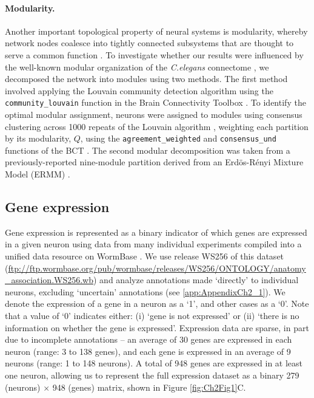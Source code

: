 \paragraph{Modularity.}
Another important topological property of neural systems is modularity, whereby network nodes coalesce into tightly connected subsystems that are thought to serve a common function \citep{Sporns2016}.
To investigate whether our results were influenced by the well-known modular organization of the \emph{C.elegans} connectome \citep{Kim2014a, Pan2010, Bassett2010, Achacoso1992, Pavlovic2014}, we decomposed the network into modules using two methods.
The first method involved applying the Louvain community detection algorithm \citep{Blondel2008} using the \texttt{community\_louvain} function in the Brain Connectivity Toolbox \citep{Rubinov2010}.
To identify the optimal modular assignment, neurons were assigned to modules using consensus clustering across 1000 repeats of the Louvain algorithm \citep{Lancichinetti2012}, weighting each partition by its modularity, $Q$, using the \texttt{agreement\_weighted} and \texttt{consensus\_und} functions of the BCT \citep{Rubinov2010}.
The second modular decomposition was taken from a previously-reported nine-module partition derived from an Erd\"os-R\'enyi Mixture Model (ERMM) \citep{Pavlovic2014}.

\subsection*{Gene expression}
Gene expression is represented as a binary indicator of which genes are expressed in a given neuron using data from many individual experiments compiled into a unified data resource on WormBase \citep{Harris2010}.
We use release WS256 of this dataset (\url{ftp://ftp.wormbase.org/pub/wormbase/releases/WS256/ONTOLOGY/anatomy_association.WS256.wb}) and analyze annotations made `directly' to individual neurons, excluding `uncertain' annotations (see \ref{app:AppendixCh2_1}).
We denote the expression of a gene in a neuron as a `1', and other cases as a `0'.
Note that a value of `0' indicates either:
(i) `gene is not expressed' or
(ii) `there is no information on whether the gene is expressed'.
Expression data are sparse, in part due to incomplete annotations -- an average of 30 genes are expressed in each neuron (range: 3 to 138 genes), and each gene is expressed in an average of 9 neurons (range: 1 to 148 neurons).
A total of 948 genes are expressed in at least one neuron, allowing us to represent the full expression dataset as a binary 279 (neurons) $\times$ 948 (genes) matrix, shown in Figure \ref{fig:Ch2Fig1}C.

